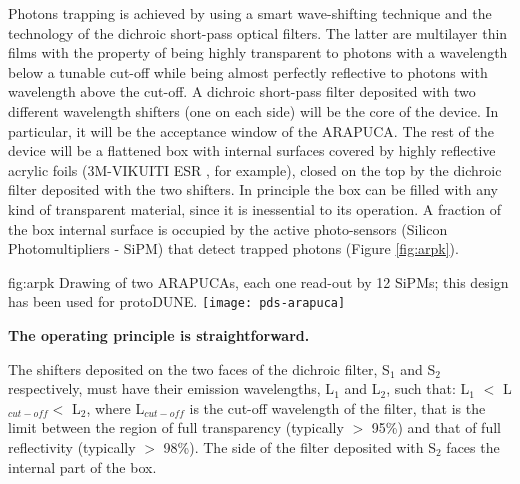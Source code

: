 Photons trapping is achieved by using a smart wave-shifting technique and the technology of the dichroic short-pass optical filters. The latter are multilayer thin films with the property of being highly transparent to photons with a wavelength below a tunable cut-off while being almost perfectly reflective to photons with wavelength above the cut-off. A dichroic short-pass filter deposited with two different wavelength shifters (one on each side) will be the core of the device. In particular, it will be the acceptance window of the ARAPUCA. The rest of the device will be a flattened box with internal surfaces covered by highly reflective acrylic foils (3M-VIKUITI ESR \cite{VIKUITI}, for example), closed on the top by the dichroic filter deposited with the two shifters. In principle the box can be filled with any kind of transparent material, since it is inessential to its operation. A fraction of the box internal surface is occupied by the active photo-sensors (Silicon Photomultipliers - SiPM) that detect trapped photons (Figure \ref{fig:arpk}).

\begin{dunefigure}{fig:arpk}
{Drawing of two ARAPUCAs, each one read-out by 12 SiPMs; this design has been used for protoDUNE.} 
\texttt{[image: pds-arapuca]}
\end{dunefigure}


{\bf The operating principle is straightforward.}

The shifters deposited on the two faces of the dichroic filter, S$_1$ and S$_2$ respectively, must have their emission wavelengths, L$_1$ and L$_2$, such that: L$_1$ $<$ L$_{cut-off}$$ <$ L$_2$, where L$_{cut-off}$ is the cut-off wavelength of the filter, that is the limit between the region of full transparency (typically $>$ 95\%) and that of full reflectivity (typically $>$ 98\%). The side of the filter deposited with S$_2$ faces the internal part of the box.

